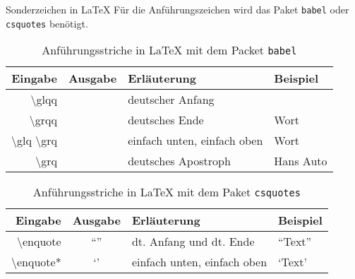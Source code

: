 \begin{frame}{Sonderzeichen in \LaTeX}
Für die Anführungszeichen wird das Paket \texttt{babel} oder \texttt{csquotes} benötigt. 
\begin{table}
	\caption{Anführungsstriche in \LaTeX{} mit dem Packet \texttt{babel}}
	\begin{tabular}{rcll}
		\hline
		Eingabe & Ausgabe & Erläuterung & Beispiel \\
		\hline
		\textbackslash glqq & \glqq & deutscher Anfang & \\
		\textbackslash grqq & \grqq & deutsches Ende & \glqq Wort \grqq \\
		\textbackslash glq \textbackslash grq & \glq\grq & einfach unten, einfach oben & \glq Wort\grq \\
		\textbackslash grq & \grq & deutsches Apostroph & Hans\grq{} Auto \\
		\hline
	\end{tabular}
\end{table}

\begin{table}
	\caption{Anführungsstriche in \LaTeX{} mit dem Paket \texttt{csquotes}}
	\begin{tabular}{rcll}
		\hline
		Eingabe & Ausgabe & Erläuterung &  Beispiel \\
		\hline
		\textbackslash enquote & \enquote{} & dt. Anfang und dt. Ende& \enquote{Text} \\
		\textbackslash enquote* & \enquote*{} & einfach unten, einfach oben & \enquote*{Text} \\ 
		\hline
	\end{tabular}
\end{table}
\end{frame}